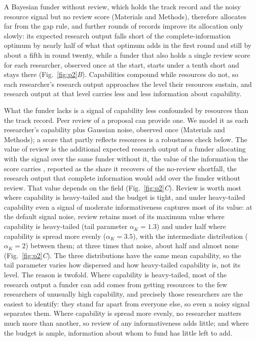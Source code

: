 \documentclass[article, 11pt, reqno]{amsart}
\theoremstyle{named}
\begin{document}
A Bayesian funder without review, which holds the track record and the noisy resource signal but no review score (Materials and Methods), therefore allocates far from the gap rule, and further rounds of records improve its allocation only slowly: its expected research output falls short of the complete-information optimum by nearly half of what that optimum adds in the first round and still by about a fifth in round twenty, while a funder that also holds a single review score for each researcher, observed once at the start, starts under a tenth short and stays there (Fig.~\ref{fig:p2}\textit{B}). Capabilities compound while resources do not, so each researcher's research output approaches the level their resources sustain, and research output at that level carries less and less information about capability.

What the funder lacks is a signal of capability less confounded by resources than the track record. Peer review of a proposal can provide one. We model it as each researcher's capability plus Gaussian noise, observed once (Materials and Methods); a score that partly reflects resources is a robustness check below. The value of review is the additional expected research output of a funder allocating with the signal over the same funder without it, the value of the information the score carries \citep{Howard1966}, reported as the share it recovers of the no-review shortfall, the research output that complete information would add over the funder without review. That value depends on the field (Fig.~\ref{fig:p2}\textit{C}). Review is worth most where capability is heavy-tailed and the budget is tight, and under heavy-tailed capability even a signal of moderate informativeness captures most of its value: at the default signal noise, review retains most of its maximum value where capability is heavy-tailed (tail parameter $\alpha_K = 1.3$) and under half where capability is spread more evenly ($\alpha_K = 3.5$), with the intermediate distribution ($\alpha_K = 2$) between them; at three times that noise, about half and almost none (Fig.~\ref{fig:p2}\textit{C}). The three distributions have the same mean capability, so the tail parameter varies how dispersed and how heavy-tailed capability is, not its level. The reason is twofold. Where capability is heavy-tailed, most of the research output a funder can add comes from getting resources to the few researchers of unusually high capability, and precisely those researchers are the easiest to identify: they stand far apart from everyone else, so even a noisy signal separates them. Where capability is spread more evenly, no researcher matters much more than another, so review of any informativeness adds little; and where the budget is ample, information about whom to fund has little left to add.
\end{document}
